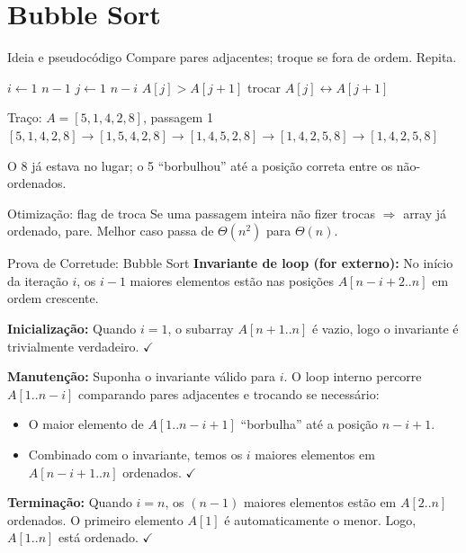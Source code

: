 \documentclass[aspectratio=169]{beamer}
\begin{document}
\section{Bubble Sort}

\begin{frame}[fragile]{Ideia e pseudocódigo}
Compare pares adjacentes; troque se fora de ordem. Repita.
\begin{codebox}
\li \For $i \gets 1$ \To $n-1$
\li \Do \For $j \gets 1$ \To $n-i$
\li     \Do \If $A[j]>A[j+1]$
\li             \Then trocar $A[j] \leftrightarrow A[j+1]$
            \End
        \End
    \End
\end{codebox}
\end{frame}

\begin{frame}{Traço: $A=[5,1,4,2,8]$, passagem 1}
$[5,1,4,2,8] \to [1,5,4,2,8] \to [1,4,5,2,8] \to [1,4,2,5,8] \to [1,4,2,5,8]$

O 8 já estava no lugar; o 5 ``borbulhou'' até a posição correta entre os não-ordenados.
\end{frame}

\begin{frame}{Otimização: flag de troca}
Se uma passagem inteira não fizer trocas $\Rightarrow$ array já ordenado, pare.
Melhor caso passa de $\Theta(n^2)$ para $\Theta(n)$.
\end{frame}

\begin{frame}[shrink]{Prova de Corretude: Bubble Sort}
\textbf{Invariante de loop (for externo):} No início da iteração $i$, os $i-1$ maiores elementos estão nas posições $A[n-i+2..n]$ em ordem crescente.

\vspace{0.3cm}
\textbf{Inicialização:} Quando $i=1$, o subarray $A[n+1..n]$ é vazio, logo o invariante é trivialmente verdadeiro. $\checkmark$

\vspace{0.3cm}
\textbf{Manutenção:} Suponha o invariante válido para $i$. O loop interno percorre $A[1..n-i]$ comparando pares adjacentes e trocando se necessário:
\begin{itemize}
\item O maior elemento de $A[1..n-i+1]$ ``borbulha'' até a posição $n-i+1$.
\item Combinado com o invariante, temos os $i$ maiores elementos em $A[n-i+1..n]$ ordenados. $\checkmark$
\end{itemize}

\vspace{0.3cm}
\textbf{Terminação:} Quando $i=n$, os $(n-1)$ maiores elementos estão em $A[2..n]$ ordenados. O primeiro elemento $A[1]$ é automaticamente o menor. Logo, $A[1..n]$ está ordenado. $\checkmark$
\end{frame}
\end{document}
